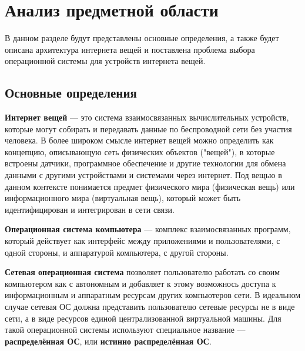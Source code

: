 \chapter{Анализ предметной области}
\label{cha:analysis}
%
%

В данном разделе будут представлены основные определения, а также будет описана архитектура интернета вещей и поставлена проблема выбора операционной системы для устройств интернета вещей.

\section{Основные определения}

\textbf{Интернет вещей} \cite{Kaspersky} --- это система взаимосвязанных вычислительных устройств, которые могут собирать и передавать данные по беспроводной сети без участия человека. В более широком смысле интернет вещей можно определить как концепцию, описывающую сеть физических объектов ("вещей"), в которые встроены датчики, программное обеспечение и другие технологии для обмена данными с другими устройствами и системами через интернет. \cite{Oracle} Под вещью в данном контексте понимается предмет физического мира (физическая вещь) или информационного мира (виртуальная вещь), который может быть идентифицирован и интегрирован в сети связи. \cite{IoT_overview}

\textbf{Операционная система компьютера} \cite{Olifer} --- комплекс взаимосвязанных программ, который действует как интерфейс между приложениями и пользователями, с одной стороны, и аппаратурой компьютера, с другой стороны.

\textbf{Сетевая операционная система} \cite{Olifer} позволяет пользователю работать со своим компьютером как с автономным и добавляет к этому возможнось доступа к информационным и аппаратным ресурсам других компьютеров сети. В идеальном случае сетевая ОС должна представить пользователю сетевые ресурсы не в виде сети, а в виде ресурсов единой централизованной виртуальной машины. Для такой операционной системы используют специальное название --- \textbf{распределённая ОС}, или \textbf{истинно распределённая ОС}.

